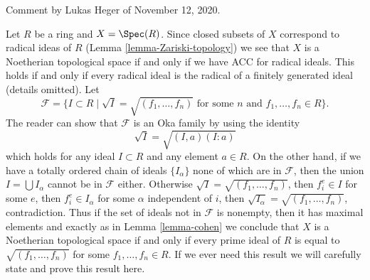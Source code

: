 \begin{example}
\label{example-noetherian-topology-on-spec}
\begin{reference}
Comment by Lukas Heger of November 12, 2020.
\end{reference}
Let $R$ be a ring and $X = \Spec(R)$. Since closed subsets of $X$ correspond to
radical ideas of $R$ (Lemma \ref{lemma-Zariski-topology}) we see that $X$ is a
Noetherian topological space if and only if we have ACC for radical ideals.
This holds if and only if every radical ideal is the radical of a finitely
generated ideal (details omitted). Let
$$
\mathcal{F} = \{I \subset R \mid
\sqrt{I} = \sqrt{(f_1, \ldots, f_n)}\text{ for some }n
\text{ and }f_1, \ldots, f_n \in R\}.
$$
The reader can show that $\mathcal{F}$ is an Oka family by using the identity
$$
\sqrt{I} = \sqrt{(I, a)(I : a)}
$$
which holds for any ideal $I \subset R$ and any element $a \in R$.
On the other hand, if we have a totally ordered chain of ideals
$\{I_\alpha\}$ none of which are in $\mathcal{F}$, then the union
$I = \bigcup I_\alpha$ cannot be in $\mathcal{F}$ either. Otherwise
$\sqrt{I} = \sqrt{(f_1, \ldots, f_n)}$, then $f_i^e \in I$ for some $e$,
then $f_i^e \in I_\alpha$ for some $\alpha$ independent of $i$, then
$\sqrt{I_\alpha} = \sqrt{(f_1, \ldots, f_n)}$, contradiction.
Thus if the set of ideals not in $\mathcal{F}$ is nonempty, then it
has maximal elements and
exactly as in Lemma \ref{lemma-cohen} we conclude that $X$ is a
Noetherian topological space if and only if every prime ideal of $R$
is equal to $\sqrt{(f_1, \ldots, f_n)}$ for some $f_1, \ldots, f_n \in R$.
If we ever need this result we will carefully state and prove this
result here.
\end{example}